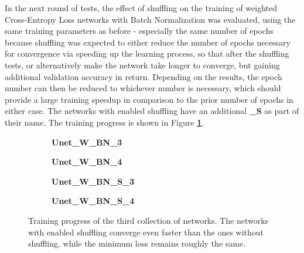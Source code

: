 In the next round of tests, the effect of shuffling on the training of weighted Cross-Entropy Loss networks with Batch Normalization was evaluated, using the same training parameters as before - especially the same number of epochs because shuffling was expected to either reduce the number of epochs necessary for convergence via speeding up the learning process, so that after the shuffling tests, or alternatively make the network take longer to converge, but gaining additional validation accuracy in return. Depending on the results, the epoch number can then be reduced to whichever number is necessary, which should provide a large training speedup in comparison to the prior number of epochs in either case. The networks with enabled shuffling have an additional \textbf{\_S} as part of their name. The training progress is shown in Figure \textbf{\ref{fig:weighted_batchnorm_shuffle_training}}.

\begin {figure}[!ht]
	\begin {subfigure}[b]{0.4\linewidth}
		\scalebox{0.65}{}
		\caption{\textbf{Unet\_W\_BN\_3}}
	\end {subfigure}\hspace{1.75cm}
	\begin {subfigure}[b]{0.4\linewidth}
		\scalebox{0.65}{}
		\caption{\textbf{Unet\_W\_BN\_4}}
	\end {subfigure}

	\begin {subfigure}[b]{0.4\linewidth}
		\scalebox{0.65}{}
		\caption{\textbf{Unet\_W\_BN\_S\_3}}
	\end {subfigure}\hspace{1.75cm}
	\begin {subfigure}[b]{0.4\linewidth}
		\scalebox{0.65}{}
		\caption{\textbf{Unet\_W\_BN\_S\_4}}
	\end {subfigure}

		\caption[Training progress of the third collection of networks.]{Training progress of the third collection of networks. The networks with enabled shuffling converge even faster than the ones without shuffling, while the minimum loss remains roughly the same.}
		\label{fig:weighted_batchnorm_shuffle_training}
\end {figure}


